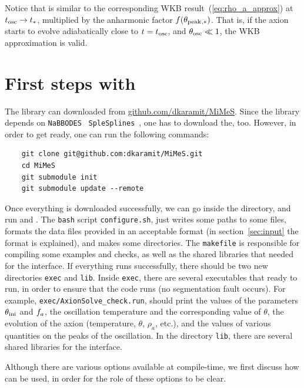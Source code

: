 \documentclass[11pt,a4paper]{article}
\begin{document}
Notice that  is similar to the corresponding WKB result~(\ref{eq:rho_a_approx}) at $t_{\rm osc}{} \to t_*$, multiplied by the anharmonic factor $f(\theta_{\rm peak}{}_{,*})$. That is, if the axion starts to evolve adiabatically close to $t=t_{\rm osc}{}$, and $\theta_{\rm osc}{} \ll 1$, the WKB approximation is valid.



\section{First steps with \mimes}\label{sec:first_steps}
\setcounter{equation}{0}
%
The library can downloaded from \href{https:/github.com/dkaramit/MiMeS}{github.com/dkaramit/MiMeS}. Since the library depends on {\tt NaBBODES}~\cite{NaBBODES} {\tt SpleSplines}~\cite{SimpleSplines}, one has to download the, too. However, in order to get \mimes ready, one can run the following commands: 
%
\begin{lstlisting}
	git clone git@github.com:dkaramit/MiMeS.git
	cd MiMeS
	git submodule init
	git submodule update --remote
\end{lstlisting}
%


Once everything is downloaded successfully, we can go inside the \mimes directory, and run  and .  The {\tt bash} script {\tt configure.sh}, just writes some paths to some files, formats the data files provided in an acceptable format (in section~\ref{sec:input} the format is explained), and makes some directories.
%
The {\tt makefile} is responsible for compiling some examples and checks, as well as the shared libraries that needed for the \PY interface.  If everything runs successfully, there should be two new directories {\tt exec} and {\tt lib}. Inside {\tt exec}, there are several executables that ready to run, in order to ensure that the code runs (\eg no segmentation fault occurs). For example, {\tt exec/AxionSolve\_check.run}, should print the values of the parameters $\theta_{\rm ini}{}$ and $f_{a}{}$, the oscillation temperature and the corresponding value of $\theta$, the evolution of the axion (\eg temperature, $\theta$, $\rho_{a}$, etc.), and the values of various quantities on the peaks of the oscillation.  In the directory {\tt lib}, there are several shared libraries for the \PY interface.

Although there are various options available at compile-time, we first discuss how \mimes can be used, in order for the role of these options to be clear. 
\end{document}
